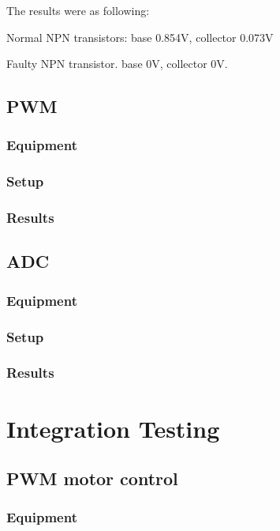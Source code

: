 The results were as following:\

Normal NPN transistors: base 0.854V, collector 0.073V\

Faulty NPN transistor. base 0V, collector 0V.\\

\subsection{PWM}

\subsubsection{Equipment}

\subsubsection{Setup}

\subsubsection{Results}

\subsection{ADC}

\subsubsection{Equipment}
 
\subsubsection{Setup}
 
\subsubsection{Results}
 
\section{Integration Testing}

\subsection{PWM motor control}
 
\subsubsection{Equipment}
 
